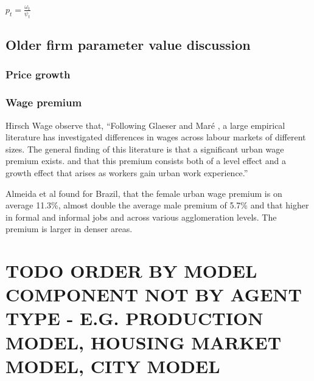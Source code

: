 $p_t= \frac{\omega_t}{\psi_t}$ 

\subsection{Older firm parameter value discussion}

\subsubsection{Price growth}


\subsubsection{Wage premium} \label{section-wage-premium}

Hirsch Wage \cite{hirschUrbanWagePremium2019} observe that, ``Following Glaeser and Maré \cite{glaeserCitiesSkills2001},  a  large  empirical  literature  has  investigated differences in wages across labour markets of different sizes. The general finding of this literature is that a significant urban wage premium exists. and that this premium consists both of a level effect and a growth effect that arises as workers gain urban work experience.'' 

Almeida et al \cite{almeidaUrbanWagePremium2022} found for Brazil, that the female urban wage premium is on average 11.3\%, almost double the average male premium of 5.7\% and that higher in formal and informal jobs and across various agglomeration levels. The premium is larger in denser areas.







\section{TODO ORDER BY MODEL COMPONENT NOT BY AGENT TYPE - E.G. PRODUCTION MODEL, HOUSING MARKET MODEL, CITY MODEL}



